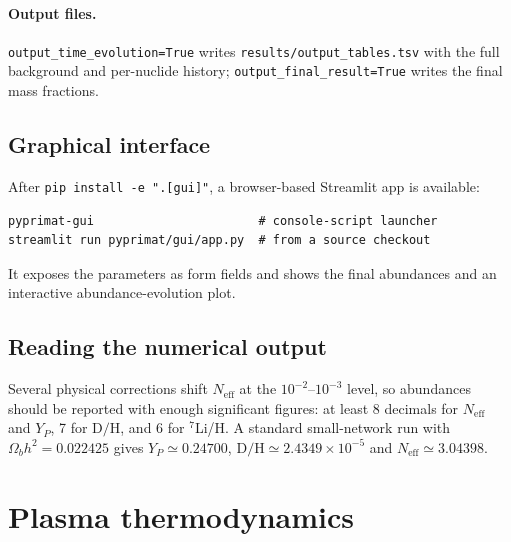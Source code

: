\documentclass[11pt,a4paper]{article}
\newcommand{\Neff}{N_{\mathrm{eff}}}
\newcommand{\YP}{Y_P}
\newcommand{\DoH}{\mathrm{D/H}}
\newcommand{\code}[1]{\texttt{#1}}
\begin{document}
\paragraph{Output files.}
\code{output\_time\_evolution=True} writes \code{results/output\_tables.tsv}
with the full background and per-nuclide history; \code{output\_final\_result=True}
writes the final mass fractions.

\subsection{Graphical interface}
After \code{pip install -e ".[gui]"}, a browser-based Streamlit app is available:
\begin{lstlisting}[style=sh]
pyprimat-gui                       # console-script launcher
streamlit run pyprimat/gui/app.py  # from a source checkout
\end{lstlisting}
It exposes the parameters as form fields and shows the final abundances and an
interactive abundance-evolution plot.

\subsection{Reading the numerical output}
Several physical corrections shift $\Neff$ at the $10^{-2}$--$10^{-3}$ level, so
abundances should be reported with enough significant figures: at least 8
decimals for $\Neff$ and $\YP$, 7 for $\DoH$, and 6 for $^{7}$Li/H. A standard
small-network run with $\Omega_b h^2 = 0.022425$ gives $\YP \simeq 0.24700$,
$\DoH \simeq 2.4349\times10^{-5}$ and $\Neff \simeq 3.04398$.

\section{Plasma thermodynamics}\label{sec:plasma}
\end{document}
